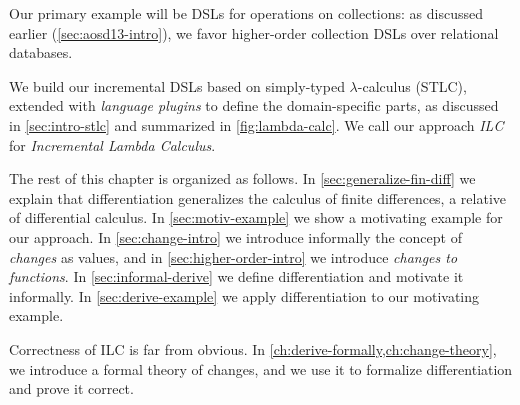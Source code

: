 

%
Our primary example will be DSLs for operations on collections:
as discussed earlier (\cref{sec:aosd13-intro}), we favor
higher-order collection DSLs over relational databases.
%

We build our incremental DSLs based on
simply-typed $\lambda$-calculus (STLC), extended with
\emph{language plugins} to define the domain-specific parts, as discussed in
\cref{sec:intro-stlc} and summarized in \cref{fig:lambda-calc}. We call our
approach \emph{ILC} for \emph{Incremental Lambda Calculus}.

The rest of this chapter is organized as follows.
In \cref{sec:generalize-fin-diff} we explain that
differentiation generalizes the calculus of finite differences, a relative of
differential calculus.
In \cref{sec:motiv-example} we show a motivating example for
our approach.
In \cref{sec:change-intro} we introduce informally
the concept of \emph{changes} as values, and in \cref{sec:higher-order-intro} we
introduce \emph{changes to functions}.
In \cref{sec:informal-derive} we define differentiation and motivate it
informally.
In \cref{sec:derive-example} we apply differentiation to our motivating example.

Correctness of ILC is far from obvious. In
\cref{ch:derive-formally,ch:change-theory}, we introduce a formal theory of
changes, and we use it to formalize differentiation and prove it correct.

